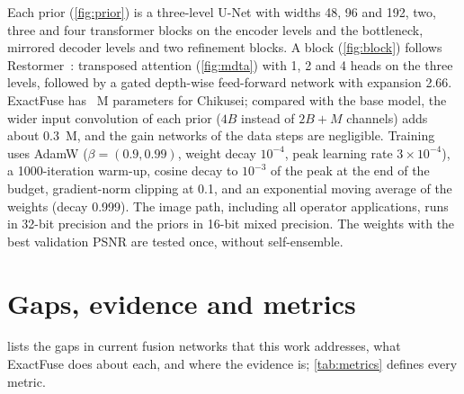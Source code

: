 \documentclass[10pt,twocolumn,letterpaper]{article}
\begin{document}
Each prior (\cref{fig:prior}) is a three-level U-Net with widths 48, 96 and 192, two, three and four transformer blocks on the encoder levels and the bottleneck, mirrored decoder levels and two refinement blocks. A block (\cref{fig:block}) follows Restormer~\cite{zamir2022restormer}: transposed attention (\cref{fig:mdta}) with 1, 2 and 4 heads on the three levels, followed by a gated depth-wise feed-forward network with expansion 2.66. ExactFuse has ~M parameters for Chikusei; compared with the base model, the wider input convolution of each prior ($4B$ instead of $2B+M$ channels) adds about 0.3~M, and the gain networks of the data steps are negligible. Training uses AdamW ($\beta=(0.9,0.99)$, weight decay $10^{-4}$, peak learning rate $3\times10^{-4}$), a 1000-iteration warm-up, cosine decay to $10^{-3}$ of the peak at the end of the budget, gradient-norm clipping at 0.1, and an exponential moving average of the weights (decay 0.999). The image path, including all operator applications, runs in 32-bit precision and the priors in 16-bit mixed precision. The weights with the best validation PSNR are tested once, without self-ensemble.

\section{Gaps, evidence and metrics}
\label{sec:gaps}
 lists the gaps in current fusion networks that this work addresses, what ExactFuse does about each, and where the evidence is; \cref{tab:metrics} defines every metric.
\end{document}
